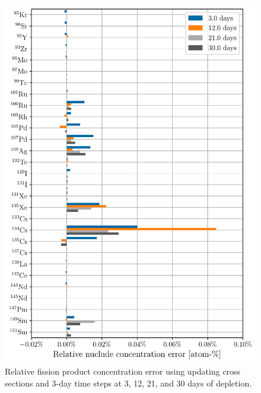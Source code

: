     \begin{figure}[htpb]
        \centering
        \includegraphics[width=\linewidth]{figs/fission_products_updating_xs_predictor_fission_q_days.pdf}
        \caption{Relative fission product concentration error using updating
        cross sections and 3-day time steps at 3, 12, 21, and 30 days of
        depletion.}
        \label{fig:fp-error-updating-xs-days}
    \end{figure}
 
